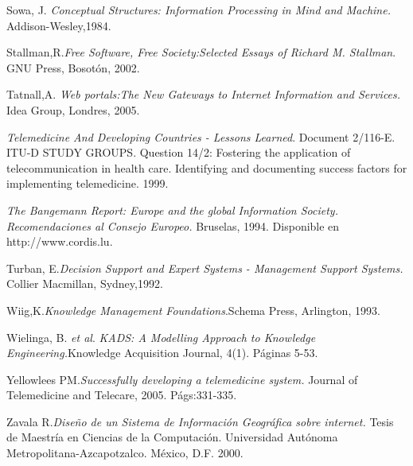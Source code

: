\begin{thebibliography}{}
 Sowa, J. \textit{Conceptual Structures: Information Processing in Mind and Machine.} Addison-Wesley,1984.

 Stallman,R.\textit{Free Software, Free Society:Selected Essays of Richard M. Stallman}. GNU Press, Bosotón, 2002.

 Tatnall,A. \textit{Web portals:The New Gateways to Internet Information and Services.} Idea Group, Londres, 2005.

 \textit{Telemedicine And Developing Countries - Lessons Learned}. Document 2/116-E. ITU-D STUDY GROUPS. Question 14/2: Fostering the application of telecommunication in health care.  Identifying and documenting success factors for implementing telemedicine. 1999.

 \textit{The Bangemann Report: Europe and the global Information Society. Recomendaciones al Consejo Europeo.} Bruselas, 1994. Disponible en http://www.cordis.lu.

 Turban, E.\textit{Decision Support and Expert Systems - Management Support Systems.} Collier Macmillan, Sydney,1992.

 Wiig,K.\textit{Knowledge Management Foundations}.Schema Press, Arlington, 1993. 

 Wielinga, B. \textit{et al}. \textit{KADS: A Modelling Approach to Knowledge Engineering.}Knowledge Acquisition Journal, 4(1). Páginas 5-53.

 Yellowlees PM.\textit{Successfully developing a telemedicine system.} Journal of Telemedicine and Telecare, 2005. Págs:331-335.

 Zavala R.\textit{Diseño de un Sistema de Información Geográfica sobre internet.} Tesis de Maestría en Ciencias de la Computación. Universidad Autónoma Metropolitana-Azcapotzalco. México, D.F. 2000.

\end{thebibliography}
